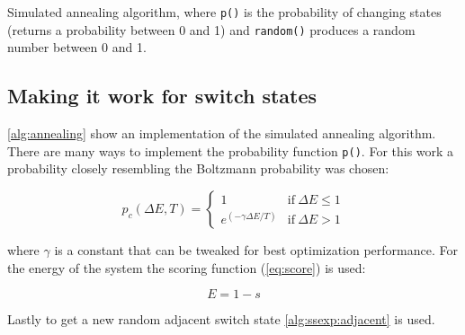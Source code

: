 \begin{algorithm}[H]
    


    \caption{
        Simulated annealing algorithm, where \texttt{p()} is the probability of changing
        states (returns a probability between 0 and 1) and \texttt{random()} produces a
        random number between 0 and 1.
    }
    \label{alg:annealing}
\end{algorithm}

\subsection{Making it work for switch states}

\autoref{alg:annealing} show an implementation of the simulated annealing algorithm.
There are many ways to implement the probability function \texttt{p()}. For this work
a probability closely resembling the Boltzmann probability was chosen:

\begin{equation}
    p_c(\Delta E, T) = \begin{cases}
        1 & \text{if} \ \Delta E \leq 1\\
        e^{(-\gamma \Delta E/ T)} & \text{if} \ \Delta E > 1
    \end{cases} 
\end{equation}

where $\gamma$ is a constant that can be tweaked for best optimization performance.
For the energy of the system the scoring function (\autoref{eq:score}) is used:

\begin{equation}
    E = 1 - s
\end{equation}

Lastly to get a new random adjacent switch state \autoref{alg:ssexp:adjacent}
is used.
